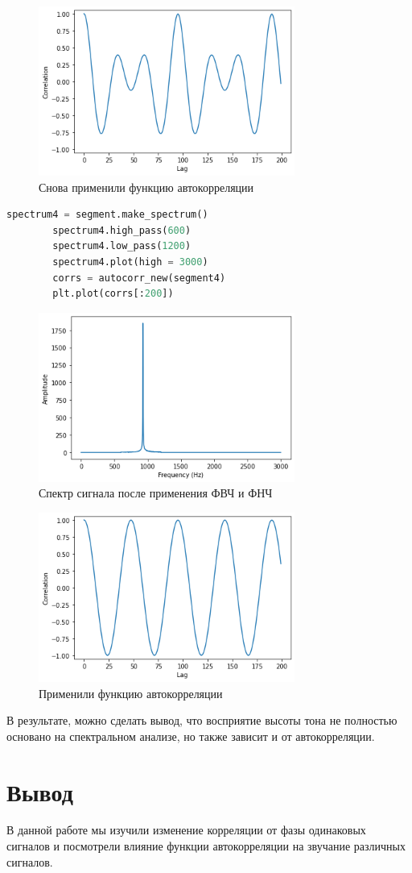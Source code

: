 \documentclass[a4paper, 12pt]{report}
\begin{document}
	\begin{figure}[H]
		\centering
		\includegraphics[width=0.75\textwidth]{sax5.png}
		\caption{Снова применили функцию автокорреляции}
		\label{fig:sax5}
	\end{figure}
	\begin{lstlisting}[language=Python,caption=Применили ФВЧ и ФНЧ]
		spectrum4 = segment.make_spectrum()
		spectrum4.high_pass(600)
		spectrum4.low_pass(1200)
		spectrum4.plot(high = 3000)
		corrs = autocorr_new(segment4)
		plt.plot(corrs[:200])
	\end{lstlisting}
	\begin{figure}[H]
		\centering
		\includegraphics[width=0.75\textwidth]{sax6.png}
		\caption{Спектр сигнала после применения ФВЧ и ФНЧ}
		\label{fig:sax6}
	\end{figure}
	\begin{figure}[H]
		\centering
		\includegraphics[width=0.75\textwidth]{sax7.png}
		\caption{Применили функцию автокорреляции}
		\label{fig:sax7}
	\end{figure}
	В результате, можно сделать вывод, что восприятие высоты тона не полностью основано на спектральном анализе, но также зависит и от автокорреляции.

	\chapter{Вывод}
	В данной работе мы изучили изменение корреляции от фазы одинаковых сигналов и посмотрели влияние функции автокорреляции на звучание различных сигналов.
\end{document}
